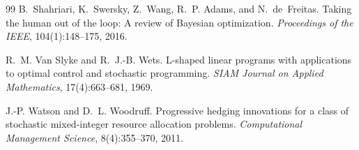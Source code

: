 \documentclass[11pt]{article}
\numberwithin{equation}{section}
\theoremstyle{plain}
\begin{document}
\begin{thebibliography}{99}
B.~Shahriari, K.~Swersky, Z.~Wang, R.~P. Adams, and N.~de~Freitas.
Taking the human out of the loop: A review of Bayesian optimization.
\textit{Proceedings of the IEEE}, 104(1):148--175, 2016.

R.~M. Van Slyke and R.~J.-B. Wets.
L-shaped linear programs with applications to optimal control and stochastic
programming.
\textit{SIAM Journal on Applied Mathematics}, 17(4):663--681, 1969.

J.-P. Watson and D.~L. Woodruff.
Progressive hedging innovations for a class of stochastic mixed-integer
resource allocation problems.
\textit{Computational Management Science}, 8(4):355--370, 2011.

\end{thebibliography}
\end{document}
